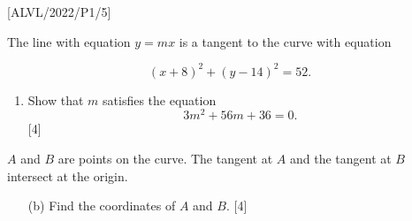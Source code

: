 \item {[}ALVL/2022/P1/5{]}

The line with equation $y=mx$ is a tangent to the curve with equation 

\[
\left(x+8\right)^{2}+\left(y-14\right)^{2}=52.
\]
 
\begin{enumerate}
\item Show that $m$ satisfies the equation 
\[
3m^{2}+56m+36=0.
\]
\hfill{}{[}4{]} 
\end{enumerate}
$A$ and $B$ are points on the curve. The tangent at $A$ and the
tangent at $B$ intersect at the origin. 
\begin{enumerate}
\item[(b)]  Find the coordinates of $A$ and $B$.\hfill{} {[}4{]}
\end{enumerate}
